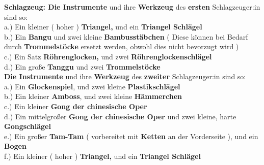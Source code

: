 \documentclass[12pt]{article}
\newcommand*\circled[1]{\tikz[baseline=(char.base)]{
            \node[shape=circle,draw,inner sep=1pt] (char) {#1};}}
\begin{document}
\begingroup
\textbf{Schlagzeug: \circled{1} Die Instrumente} und ihre \textbf{Werkzeug} des \textbf{ersten} Schlagzeuger:in sind so: \\
a.) Ein kleiner ( hoher ) \textbf{Triangel,} und ein \textbf{Triangel Schlägel} \\
b.) Ein \textbf{Bangu \setmainfont{Source Han Serif SC Bold}\selectfont{ ( 板鼓 ), } }und zwei kleine \textbf{Bambusstäbchen} ( Diese können bei Bedarf durch \textbf{Trommelstöcke} ersetzt werden, obwohl dies nicht bevorzugt wird ) \\
c.) Ein Satz \textbf{Röhrenglocken,} und zwei \textbf{Röhrenglockenschlägel} \\
d.) Ein große \textbf{Tanggu \setmainfont{Source Han Serif SC Bold}\selectfont{ ( 堂鼓 ), } }und zwei \textbf{Trommelstöcke}\\
\textbf{\circled{3} Die Instrumente} und ihre \textbf{Werkzeug} des \textbf{zweiter} Schlagzeuger:in sind so: \\
a.) Ein \textbf{Glockenspiel}, und zwei kleine \textbf{Plastikschlägel} \\
b.) Ein kleiner \textbf{Amboss}, und zwei kleine \textbf{Hämmerchen} \\
c.) Ein kleiner \textbf{Gong der chinesische Oper\setmainfont{Source Han Serif SC Bold}\selectfont{ ( 小鑼 ) } }  \\
d.) Ein mittelgroßer \textbf{Gong der chinesische Oper \setmainfont{Source Han Serif SC Bold}\selectfont{ ( 中型鑼 ), } } und zwei kleine, harte \textbf{Gongschlägel}\\
e.) Ein großer \textbf{Tam-Tam} ( vorbereitet mit \textbf{Ketten} an der Vorderseite ), und ein \textbf{Bogen} \\
f.) Ein kleiner ( hoher ) \textbf{Triangel,} und ein \textbf{Triangel Schlägel} \\
\endgroup
\end{document}
